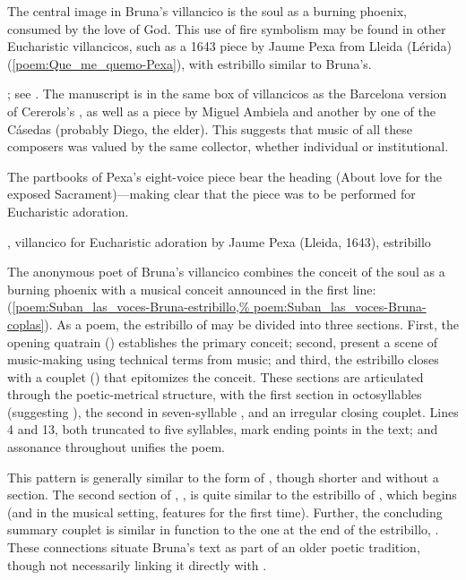 The central image in Bruna's villancico is the soul as a burning phoenix,
consumed by the love of God.
This use of fire symbolism may be found in other Eucharistic villancicos, such
as a 1643 piece by Jaume Pexa from Lleida (Lérida)
(\cref{poem:Que_me_quemo-Pexa}), with estribillo similar to Bruna's.%
\begin{Footnote}
    ; see .
    The manuscript is in the same box of villancicos as the Barcelona version
    of Cererols's , as well as a piece by Miguel
    Ambiela and another by one of the Cásedas (probably Diego, the elder).  
    This suggests that music of all these composers was valued by the same
    collector, whether individual or institutional.
\end{Footnote}
The partbooks of Pexa's eight-voice piece bear the heading  (About love for the exposed Sacrament)---making clear that
the piece was to be performed for Eucharistic adoration.  

{, villancico for Eucharistic adoration by Jaume Pexa
(Lleida, 1643), estribillo}


The anonymous poet of Bruna's villancico combines the conceit of the soul as a
burning phoenix with a musical conceit announced in the first line:  (\cref{poem:Suban_las_voces-Bruna-estribillo,%
poem:Suban_las_voces-Bruna-coplas}).
As a poem, the estribillo of  may be divided into three
sections. 
First, the opening quatrain () establishes the primary conceit;
second,  present a scene of music-making using technical terms
from music; and third, the estribillo closes with a couplet
() that epitomizes the conceit.
These sections are articulated through the poetic-metrical structure, with the
first section in octosyllables (suggesting ), the second in
seven-syllable , and an irregular closing couplet.
Lines 4 and 13, both truncated to five syllables, mark ending points in the
text; and assonance throughout unifies the poem.

This pattern is generally similar to the form of , though shorter and without a  section.  
The second section of , , is quite similar to the estribillo of , which begins
 (and in the musical
setting, features  for the first time).
Further, the concluding summary couplet is similar in function to the one at
the end of the  estribillo, .
These connections situate Bruna's text as part of an older poetic tradition,
though not necessarily linking it directly with .

